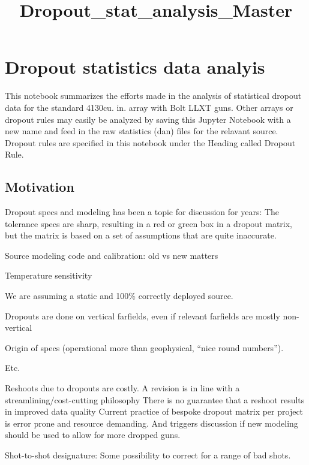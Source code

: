 \documentclass[11pt]{article}
\title{Dropout\_stat\_analysis\_Master}
\begin{document}
    
    
    \maketitle
    
    

    
    \section{Dropout statistics data
analyis}\label{dropout-statistics-data-analyis}

This notebook summarizes the efforts made in the analysis of statistical
dropout data for the standard 4130cu. in. array with Bolt LLXT guns.
Other arrays or dropout rules may easily be analyzed by saving this
Jupyter Notebook with a new name and feed in the raw statistics (dan)
files for the relavant source. Dropout rules are specified in this
notebook under the Heading called Dropout Rule.

    \subsection{Motivation}\label{motivation}

Dropout specs and modeling has been a topic for discussion for years:
The tolerance specs are sharp, resulting in a red or green box in a
dropout matrix, but the matrix is based on a set of assumptions that are
quite inaccurate.

Source modeling code and calibration: old vs new matters

Temperature sensitivity

We are assuming a static and 100\% correctly deployed source.

Dropouts are done on vertical farfields, even if relevant farfields are
mostly non-vertical

Origin of specs (operational more than geophysical, ``nice round
numbers'').

Etc.

Reshoots due to dropouts are costly. A revision is in line with a
streamlining/cost-cutting philosophy There is no guarantee that a
reshoot results in improved data quality Current practice of bespoke
dropout matrix per project is error prone and resource demanding. And
triggers discussion if new modeling should be used to allow for more
dropped guns.

Shot-to-shot designature: Some possibility to correct for a range of bad
shots.
\end{document}
